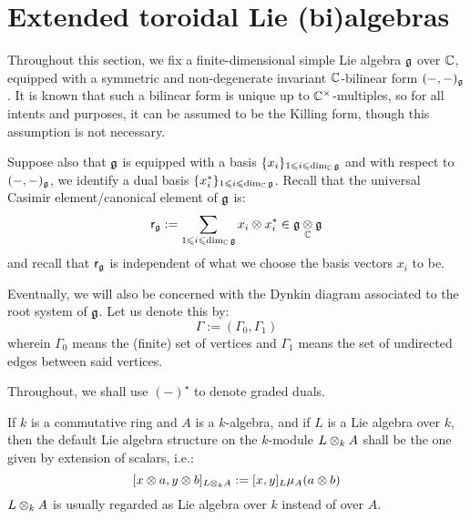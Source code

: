\section{Extended toroidal Lie (bi)algebras}
    \begin{convention} \label{conv: a_fixed_finite_dimensional_simple_lie_algebra}
        Throughout this section, we fix a finite-dimensional simple Lie algebra $\mathfrak{g}$ over $\mathbb{C}$, equipped with a symmetric and non-degenerate invariant $\mathbb{C}$-bilinear form $(-, -)_{\mathfrak{g}}$. It is known that such a bilinear form is unique up to $\bbC^{\x}$-multiples, so for all intents and purposes, it can be assumed to be the Killing form, though this assumption is not necessary. 

        Suppose also that $\mathfrak{g}$ is equipped with a basis $\{x_i\}_{1 \leqslant i \leqslant \dim_{\mathbb{C}} \mathfrak{g}}$ and with respect to $(-, -)_{\mathfrak{g}}$, we identify a dual basis $\{x_i^*\}_{1 \leqslant i \leqslant \dim_{\mathbb{C}} \mathfrak{g}}$. Recall that the universal Casimir element/canonical element of $\mathfrak{g}$ is:
            $$\sfr_{\g} := \sum_{1 \leq i \leq \dim_{\bbC} \g} x_i \tensor x_i^* \in \g \tensor_{\bbC} \g$$
        and recall that $\mathsf{r}_{\mathfrak{g}}$ is independent of what we choose the basis vectors $x_i$ to be.

        Eventually, we will also be concerned with the Dynkin diagram associated to the root system of $\mathfrak{g}$. Let us denote this by:
            $$\Gamma := (\Gamma_0, \Gamma_1)$$
        wherein $\Gamma_0$ means the (finite) set of vertices and $\Gamma_1$ means the set of undirected edges between said vertices. 
    \end{convention}

    \begin{convention}
        Throughout, we shall use $(-)^{\star}$ to denote graded duals. 
    \end{convention}

    \begin{convention}
        If $k$ is a commutative ring and $A$ is a $k$-algebra, and if $L$ is a Lie algebra over $k$, then the default Lie algebra structure on the $k$-module $L \tensor_k A$ shall be the one given by extension of scalars, i.e.:
            $$[x \tensor a, y \tensor b]_{L \tensor_k A} := [x, y]_L \mu_A(a \tensor b)$$
        $L \tensor_k A$ is usually regarded as Lie algebra over $k$ instead of over $A$.  
    \end{convention}

